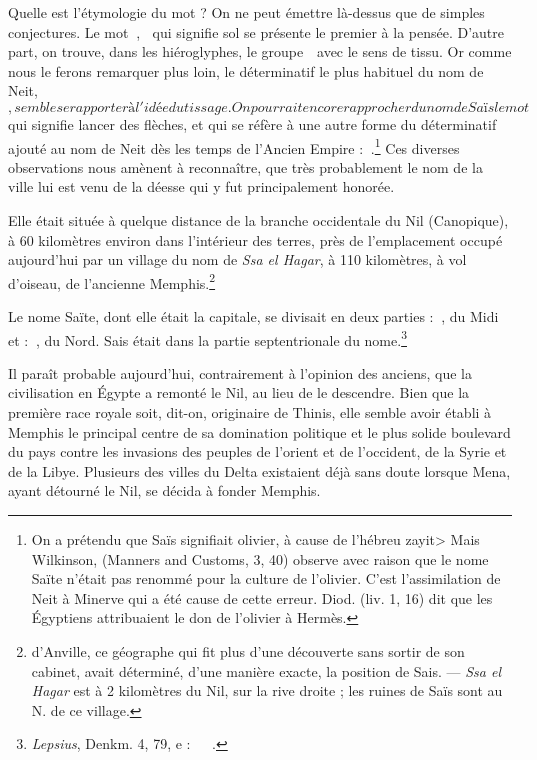 \documentclass[a4paper, 11pt, oneside]{article}
\newcommand*\hieroAAAB{}
\newcommand*\hieroAAAI{}
\newcommand*\hieroAAAK{}
\newcommand*\hieroAAAL{}
\newcommand*\hieroAAAM{}
\newcommand*\hieroAAAN{\raisebox{0.3ex}{}}
\newcommand*\hieroAAAO{}
\newcommand*\hieroAAAP{}
\newcommand*\hieroAAAQ{}
\newcommand*\hieroAAAR{}
\newcommand*\hieroAAAX{}
\newcommand*\hieroAAAY{}
\newcommand*\hieroAAAZ{}
\newcommand*\hieroAABA{}
\newcommand*\hieroAABB{}
\newcommand*\hieroAABC{\raisebox{0.5ex}{}}
\newcommand*\hieroAABD{}
\newcommand*\hieroAABE{}
\begin{document}
Quelle est l'étymologie du mot ? On ne peut émettre là-dessus que de simples conjectures. Le mot $\hieroAAAI\:\hieroAAAK$, $\hieroAAAI\:\hieroAAAL$ qui signifie sol se présente le premier à la pensée. D'autre part, on trouve, dans les hiéroglyphes, le groupe $\hieroAAAM\:\hieroAAAN$ avec le sens de tissu. Or comme nous le ferons remarquer plus loin, le déterminatif le plus habituel du nom de Neit, $\hieroAAAO$, semble se rapporter à l'idée du tissage. On pourrait encore rapprocher du nom de Saïs le mot $\hieroAAAP$ qui signifie lancer des flèches, et qui se réfère à une autre forme du déterminatif ajouté au nom de Neit dès les temps de l'Ancien Empire : $\hieroAAAQ\:\hieroAAAR$.\footnote{On a prétendu que Saïs signifiait olivier, à cause de l'hébreu \foreignlanguage{hebrew}{\<zayit>} Mais Wilkinson, (Manners and Customs, 3, 40) observe avec raison que le nome Saïte n'était pas renommé pour la culture de l'olivier. C'est l'assimilation de Neit à Minerve qui a été cause de cette erreur. Diod. (liv. 1, 16) dit que les Égyptiens attribuaient le don de l'olivier à Hermès.} Ces diverses observations nous amènent à reconnaître, que très probablement le nom de la ville lui est venu de la déesse qui y fut principalement honorée.

Elle était située à quelque distance de la branche occidentale du Nil (Canopique), à 60 kilomètres environ dans l'intérieur des terres, près de l'emplacement occupé aujourd’hui par un village du nom de \emph{Ssa el Hagar}, à 110 kilomètres, à vol d'oiseau, de l'ancienne Memphis.\footnote{d'Anville, ce géographe qui fit plus d'une découverte sans sortir de son cabinet, avait déterminé, d'une manière exacte, la position de Sais. --- \emph{Ssa el Hagar} est à 2 kilomètres du Nil, sur la rive droite ; les ruines de Saïs sont au N. de ce village.}

Le nome Saïte, dont elle était la capitale, se divisait en deux parties : $\hieroAAAB\:\hieroAAAX$, du Midi et : $\hieroAAAB\:\hieroAAAY$, du Nord. Sais était dans la partie septentrionale du nome.\footnote{\emph{Lepsius}, Denkm. 4, 79, e : $\hieroAAAZ\:\hieroAABA\:\hieroAABB\:\hieroAABC\:\hieroAABD\:\hieroAABE$.}

Il paraît probable aujourd'hui, contrairement à l'opinion des anciens, que la civilisation en Égypte a remonté le Nil, au lieu de le descendre. Bien que la première race royale soit, dit-on, originaire de Thinis, elle semble avoir établi à Memphis le principal centre de sa domination politique et le plus solide boulevard du pays contre les invasions des peuples de l'orient et de l'occident, de la Syrie et de la Libye. Plusieurs des villes du Delta existaient déjà sans doute lorsque Mena, ayant détourné le Nil, se décida à fonder Memphis.
\end{document}
